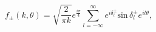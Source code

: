 \begin{equation}
\label{Eq_0215}
f_{\pm}(k, \theta)
  = \sqrt{\frac{2}{\pi k}} e^{\frac{i\pi}{4}}
  \sum^{\infty}_{l = -\infty} e^{i\delta^{\pm}_{l}}
  \text{sin} \, \delta^{\pm}_{l} e^{il \theta}, 
\end{equation}

